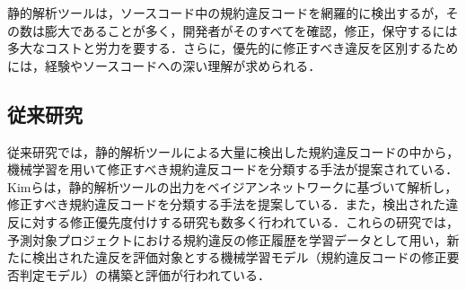\documentclass[submit]{ipsj}
\begin{document}
静的解析ツールは，ソースコード中の規約違反コードを網羅的に検出するが，その数は膨大であることが多く，開発者がそのすべてを確認，修正，保守するには多大なコストと労力を要する\cite{UsingStaticAnalysisTools2}．さらに，優先的に修正すべき違反を区別するためには，経験やソースコードへの深い理解が求められる\cite{shuseisarenai}．


\subsection{従来研究}


従来研究では，静的解析ツールによる大量に検出した規約違反コードの中から，機械学習を用いて修正すべき規約違反コードを分類する手法が提案されている\cite{JyuraiPre}\cite{beizu}．
Kimらは，静的解析ツールの出力をベイジアンネットワークに基づいて解析し，修正すべき規約違反コードを分類する手法を提案している\cite{beizu}．また，検出された違反に対する修正優先度付けする研究も数多く行われている\cite{Wang}\cite{Qing}\cite{HowFar}．これらの研究では，予測対象プロジェクトにおける規約違反の修正履歴を学習データとして用い，新たに検出された違反を評価対象とする機械学習モデル（規約違反コードの修正要否判定モデル）の構築と評価が行われている．



\end{document}
